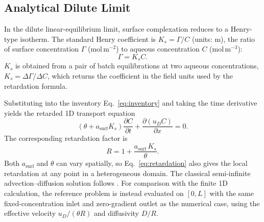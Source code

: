 \subsection{Analytical Dilute Limit}

In the dilute linear-equilibrium limit, surface complexation reduces to a
Henry-type isotherm. The standard Henry coefficient is $K_s = \Gamma / C$
(units: m), the ratio of surface concentration $\Gamma$ (mol\,m$^{-2}$) to
aqueous concentration $C$ (mol\,m$^{-3}$):
\begin{equation}
\Gamma = K_s C.
\end{equation}
$K_s$ is obtained from a pair of batch equilibrations at two aqueous
concentrations, $K_s = \Delta\Gamma / \Delta C$, which returns the coefficient
in the field units used by the retardation formula.

Substituting into the inventory Eq.~\eqref{eq:inventory} and taking the
time derivative yields the retarded 1D transport equation
\begin{equation}
\left(
\theta + a_{\mathrm{surf}}K_s
\right)\frac{\partial C}{\partial t}
+ \frac{\partial (u_D C)}{\partial x} = 0.
\end{equation}
The corresponding retardation factor is
\begin{equation}
R = 1 + \frac{a_{\mathrm{surf}}\,K_s}{\theta}.
\label{eq:retardation}
\end{equation}
Both $a_{\mathrm{surf}}$ and $\theta$ can vary spatially, so
Eq.~\eqref{eq:retardation} also gives the local retardation at any point in
a heterogeneous domain. The classical semi-infinite advection--diffusion
solution follows \citet{ogata1961solution}. For comparison with the finite 1D
calculation, the reference problem is instead evaluated on $[0,L]$ with the
same fixed-concentration inlet and zero-gradient outlet as the numerical case,
using the effective velocity $u_D/(\theta R)$ and diffusivity $D/R$.

